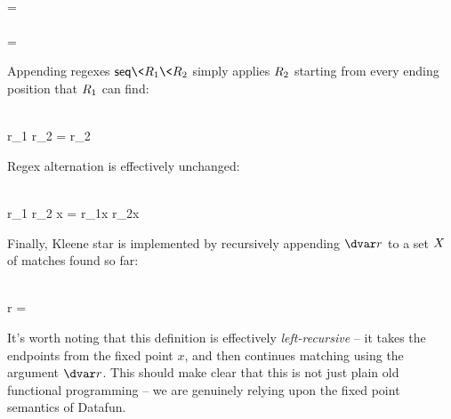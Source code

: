 \nopagebreak[2]
\begin{code}
   \isa \iso\tchar \to \tre\\
   \< \<
  = 
  \\[\betweenfunctionskip]
   \isa \tre \to \tre\\
   \< = 
\end{code}

\noindent
Appending regexes $\name{seq}\<\mvar r_1\<\mvar r_2$ simply applies $\mvar r_2$ starting from
every ending position that $\mvar r_1$ can find:

\nopagebreak[2]
\begin{code}
   \isa \tre \to \tre \to \tre\\
   \<\mvar r_1 \<\mvar r_2 \< =
  \mvar r_2 \<
\end{code}

\noindent
Regex alternation  is effectively unchanged:

\nopagebreak[2]
\begin{code}
   \isa \tre \to \tre \to \tre\\
   \<\mvar r_1 \<\mvar r_2 \<\mvar x = \mvar r_1\<\mvar x \vee \mvar r_2\<\mvar x
\end{code}

\noindent
Finally, Kleene star is implemented by recursively appending $\dvar r$ to a
set $\mvar x$ of matches found so far:

\nopagebreak[2]
\begin{code}
   \isa \iso\tre \to \tre\\
   \<\pboxvar r \<
  = 
\end{code}

\noindent
It's worth noting that this definition is effectively \emph{left-recursive} --
it takes the endpoints from the fixed point $x$, and then continues matching
using the argument $\dvar r$. This should make clear that this is not just plain
old functional programming -- we are genuinely relying upon the fixed point
semantics of Datafun.

